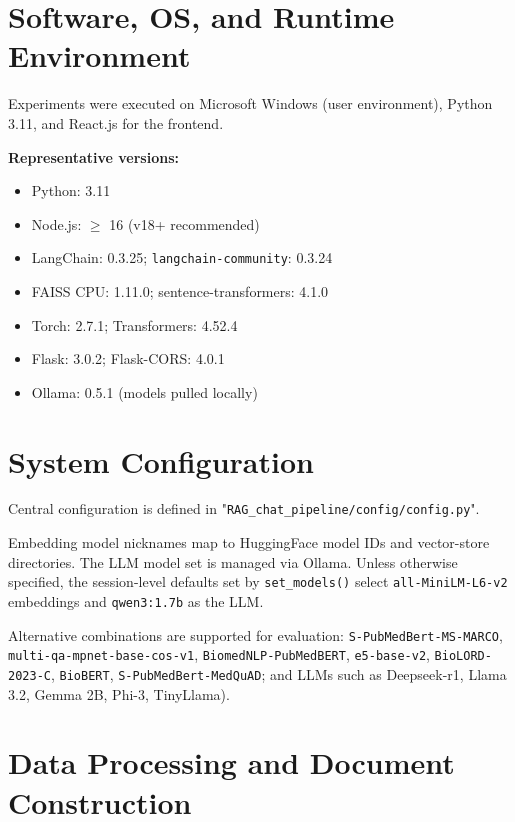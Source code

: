 \section{Software, OS, and Runtime Environment}
Experiments were executed on Microsoft Windows (user environment), Python 3.11, and React.js for the frontend.

\smallskip
\noindent\textbf{Representative versions:}
\begin{itemize}
  \item Python: 3.11
  \item Node.js: \(\ge\) 16 (v18+ recommended)
  \item LangChain: 0.3.25; \texttt{langchain-community}: 0.3.24
  \item FAISS CPU: 1.11.0; sentence-transformers: 4.1.0
  \item Torch: 2.7.1; Transformers: 4.52.4
  \item Flask: 3.0.2; Flask-CORS: 4.0.1
  \item Ollama: 0.5.1 (models pulled locally)
\end{itemize}

\section{System Configuration}
Central configuration is defined in "\texttt{RAG\_chat\_pipeline/config/config.py}".

\noindent Embedding model nicknames map to HuggingFace model IDs and vector-store directories. The LLM model set is managed via Ollama. Unless otherwise specified, the session-level defaults set by \texttt{set\_models()} select \texttt{all-MiniLM-L6-v2} embeddings and \texttt{qwen3:1.7b} as the LLM. 

Alternative combinations are supported for evaluation: \texttt{S-PubMedBert-MS-MARCO}, \texttt{multi-qa-mpnet-base-cos-v1}, \texttt{BiomedNLP-PubMedBERT}, \texttt{e5-base-v2}, \texttt{BioLORD-2023-C}, \texttt{BioBERT}, \texttt{S-PubMedBert-MedQuAD}; and LLMs such as Deepseek-r1, Llama 3.2, Gemma 2B, Phi-3, TinyLlama).

\section{Data Processing and Document Construction}

